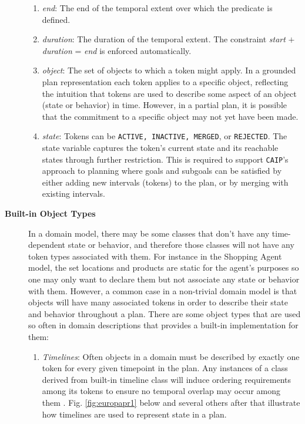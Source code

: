 \begin{description}
\begin{enumerate}
  \item \textit {end}: The end of the temporal extent over which the
    predicate is defined.

  \item \textit {duration}: The duration of the temporal extent. The
    constraint \textit{start} $+$ \textit{duration} = \textit{end} is
    enforced automatically.

  \item \textit{object}: The set of objects to which a token might
    apply. In a grounded plan representation each token applies to a
    specific object, reflecting the intuition that tokens are used to
    describe some aspect of an object (\ie state or behavior) in
    time. However, in a partial plan, it is possible that the
    commitment to a specific object may not yet have been made.

  \item \textit{state}: Tokens can be \texttt{ACTIVE, INACTIVE,
      MERGED}, or \texttt{REJECTED}. The state variable captures the
    token's current state and its reachable states through further
    restriction.  This is required to support \texttt{CAIP}'s approach
    to planning where goals and subgoals can be satisfied by either
    adding new intervals (tokens) to the plan, or by merging with
    existing intervals.
    
  \end{enumerate}

\item[\textbf{Built-in Object Types}] In a domain model, there may be
  some classes that don't have any time-dependent state or behavior,
  and therefore those classes will not have any token types associated
  with them. For instance in the Shopping Agent model, the set
  locations and products are static for the agent's purposes so one
  may only want to declare them but not associate any state or
  behavior with them.  However, a common case in a non-trivial domain
  model is that objects will have many associated tokens in order to
  describe their state and behavior throughout a plan. There are some
  object types that are used so often in domain descriptions that \eu
  provides a built-in implementation for them:

\begin{enumerate}

\item \textit{Timelines}: Often objects in a domain must be described
  by exactly one token for every given timepoint in the plan. Any
  instances of a class derived from \eus built-in timeline class will
  induce ordering requirements among its tokens to ensure no temporal
  overlap may occur among them \cite{mus94}. Fig. \ref{fig:europapr1}
  below and several others after that illustrate how timelines are
  used to represent state in a plan.


\end{enumerate}
\end{description}
